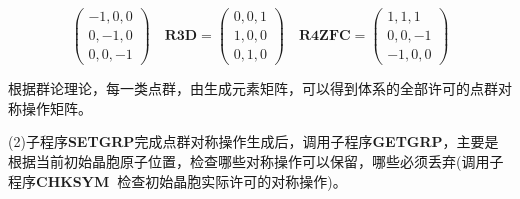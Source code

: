 \documentclass{article}      %
\begin{document}
\begin{itemize}
\begin{displaymath}
\begin{pmatrix}
		-1, 0, 0 \\ 
		0,-1, 0 \\
		0, 0, -1
	\end{pmatrix}\quad
	\mathbf{R3D}=
	\begin{pmatrix}
		0, 0, 1 \\ 
		1, 0, 0 \\
		0, 1, 0
	\end{pmatrix}\quad
	\mathbf{R4ZFC}=
	\begin{pmatrix}
		1, 1, 1 \\ 
		0, 0, -1 \\
		-1, 0, 0
	\end{pmatrix}
\end{displaymath}
\end{itemize}
根据群论理论，每一类点群，由生成元素矩阵，可以得到体系的全部许可的点群对称操作矩阵。

(2)子程序\textbf{SETGRP}完成点群对称操作生成后，调用子程序\textbf{GETGRP}，主要是根据当前初始晶胞原子位置，检查哪些对称操作可以保留，哪些必须丢弃(调用子程序\textbf{CHKSYM~}检查初始晶胞实际许可的对称操作)。
\end{document}
